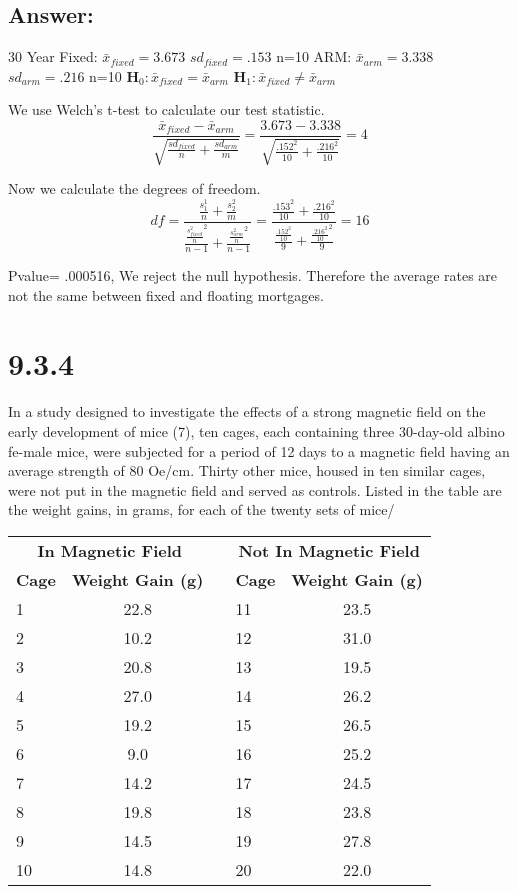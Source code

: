 \documentclass[svgnames]{article}
\begin{document}
\subsection*{Answer:}
30 Year Fixed:
$\bar{x}_{fixed}=3.673$
$sd_{fixed} = .153$
n=10
ARM:
$\bar{x}_{arm}=3.338$
$sd_{arm} = .216$
n=10
\newline
\textbf{H$_0: \bar{x}_{fixed} = \bar{x}_{arm} $}
\newline
\textbf{H$_1:\bar{x}_{fixed} \neq \bar{x}_{arm} $}
\newline

We use Welch's t-test to calculate our test statistic.
$$\frac{\bar{x}_{fixed}- \bar{x}_{arm} }{\sqrt{\frac{sd_{fixed}}{n}+\frac{sd_{arm}}{m}}}=\frac{3.673 - 3.338}{\sqrt{\frac{.152^2}{10}+\frac{.216^2}{10}}}=4$$

Now we calculate the degrees of freedom.
$$df=\frac{\frac{s_1^1}{n}+\frac{s_2^2}{m}}{\frac{\frac{s_{fixed}^2}{n}^2}{n-1}+\frac{\frac{s_{arm}^2}{n}^2}{n-1}} = \frac{\frac{.153^2}{10}+\frac{.216^2}{10}}{\frac{\frac{.152^2}{10}}{9}+\frac{\frac{.216^2}{10}^2}{9}}=16$$

Pvalue= .000516, We reject the null hypothesis. Therefore the average rates are not the same between fixed and floating mortgages. 

\section{9.3.4}

In a study designed to investigate the effects of a strong magnetic field on the early development of mice (7), ten cages, each containing three 30-day-old albino fe-male mice, were subjected for a period of 12 days to a magnetic field having an average strength of 80 Oe/cm. Thirty other mice, housed in ten similar cages, were not put in the magnetic field and served as controls. Listed in the table are the weight gains, in grams, for each of the twenty sets of mice/ 

\begin{table}[H]
\centering
 \begin{tabular}{l c c l c} 
 \hline
\multicolumn{2}{c}{\bf In Magnetic Field}  & & \multicolumn{2}{c}{\bf Not In Magnetic Field} \\
\cline{1-2} \cline{4-5} 
\bf  Cage & \bf  Weight Gain (g) && \bf  Cage & \bf  Weight Gain (g)  \\
\hline
1 & 22.8  && 11  & 23.5 \\
2 &  10.2  && 12 &  31.0  \\
3 &  20.8  && 13 &  19.5  \\
4  & 27.0 &&  14  & 26.2\\
5 & 19.2 && 15 & 26.5\\
6 & 9.0 && 16 & 25.2\\
7 & 14.2 && 17 & 24.5 \\
8 & 19.8 && 18 & 23.8\\
9 & 14.5 && 19 & 27.8\\
10 & 14.8  && 20 & 22.0 \\
 \hline
 \end{tabular}
\end{table}
\end{document}

